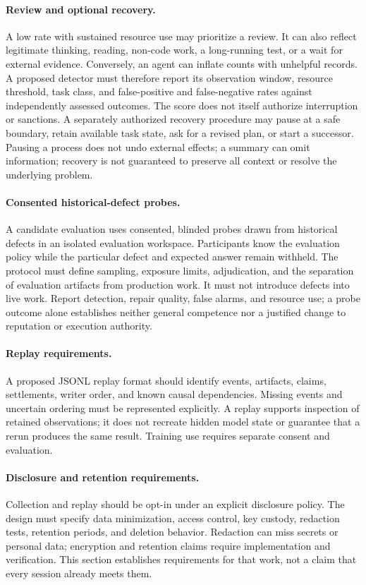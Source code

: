 \documentclass[11pt,a4paper]{article}
\theoremstyle{definition}
\theoremstyle{remark}
\begin{document}
\paragraph{Review and optional recovery.}
A low rate with sustained resource use may prioritize a review. It can also
reflect legitimate thinking, reading, non-code work, a long-running test, or a
wait for external evidence. Conversely, an agent can inflate counts with
unhelpful records. A proposed detector must therefore report its observation
window, resource threshold, task class, and false-positive and false-negative
rates against independently assessed outcomes. The score does not itself
authorize interruption or sanctions. A separately authorized recovery procedure
may pause at a safe boundary, retain available task state, ask for a revised
plan, or start a successor. Pausing a process does not undo external effects;
a summary can omit information; recovery is not guaranteed to preserve all
context or resolve the underlying problem.

\paragraph{Consented historical-defect probes.}
A candidate evaluation uses consented, blinded probes drawn from historical
defects in an isolated evaluation workspace. Participants know the evaluation
policy while the particular defect and expected answer remain withheld. The
protocol must define sampling, exposure limits, adjudication, and the separation
of evaluation artifacts from production work. It must not introduce defects into
live work. Report detection, repair quality, false alarms, and resource use;
a probe outcome alone establishes neither general competence nor a justified
change to reputation or execution authority.

\paragraph{Replay requirements.}
A proposed JSONL replay format should identify events, artifacts, claims,
settlements, writer order, and known causal dependencies. Missing events and
uncertain ordering must be represented explicitly. A replay supports inspection
of retained observations; it does not recreate hidden model state or guarantee
that a rerun produces the same result. Training use requires separate consent
and evaluation.

\paragraph{Disclosure and retention requirements.}
Collection and replay should be opt-in under an explicit disclosure policy.
The design must specify data minimization, access control, key custody,
redaction tests, retention periods, and deletion behavior. Redaction can miss
secrets or personal data; encryption and retention claims require implementation
and verification. This section establishes requirements for that work, not a
claim that every session already meets them.
\end{document}
